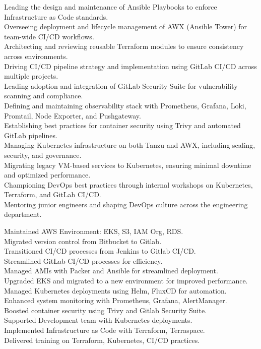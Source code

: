 \documentclass[10pt,a4paper,sans]{moderncv} %
\begin{document}
{
	Leading the design and maintenance of Ansible Playbooks to enforce Infrastructure as Code standards.\\
	Overseeing deployment and lifecycle management of AWX (Ansible Tower) for team-wide CI/CD workflows.\\
	Architecting and reviewing reusable Terraform modules to ensure consistency across environments.\\
	Driving CI/CD pipeline strategy and implementation using GitLab CI/CD across multiple projects.\\
	Leading adoption and integration of GitLab Security Suite for vulnerability scanning and compliance.\\
	Defining and maintaining observability stack with Prometheus, Grafana, Loki, Promtail, Node Exporter, and Pushgateway.\\
	Establishing best practices for container security using Trivy and automated GitLab pipelines.\\
	Managing Kubernetes infrastructure on both Tanzu and AWX, including scaling, security, and governance.\\
	Migrating legacy VM-based services to Kubernetes, ensuring minimal downtime and optimized performance.\\
	Championing DevOps best practices through internal workshops on Kubernetes, Terraform, and GitLab CI/CD.\\
	Mentoring junior engineers and shaping DevOps culture across the engineering department.\\
}


{
	Maintained AWS Environment: EKS, S3, IAM Org, RDS.\\
	Migrated version control from Bitbucket to Gitlab.\\
	Transitioned CI/CD processes from Jenkins to Gitlab CI/CD.\\
	Streamlined GitLab CI/CD processes for efficiency.\\
	Managed AMIs with Packer and Ansible for streamlined deployment.\\
	Upgraded EKS and migrated to a new environment for improved performance.\\
	Managed Kubernetes deployments using Helm, FluxCD for automation.\\
	Enhanced system monitoring with Prometheus, Grafana, AlertManager.\\
	Boosted container security using Trivy and Gitlab Security Suite.\\
	Supported Development team with Kubernetes deployments.\\
	Implemented Infrastructure as Code with Terraform, Terraspace.\\
	Delivered training on Terraform, Kubernetes, CI/CD practices.\\
}
\end{document}

